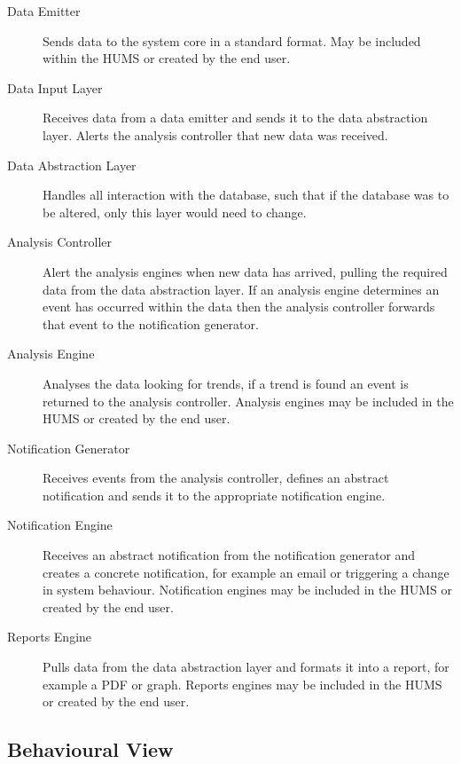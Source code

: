 \documentclass[10pt,a4paper]{article}
\begin{document}
\begin{description}
  \item[Data Emitter] Sends data to the system core in a standard
    format. May be included within the HUMS or created by the end
    user.

  \item[Data Input Layer] Receives data from a data emitter and sends
    it to the data abstraction layer. Alerts the analysis controller
    that new data was received.

  \item[Data Abstraction Layer] Handles all interaction with the
    database, such that if the database was to be altered, only this
    layer would need to change.

  \item[Analysis Controller] Alert the analysis engines when new data
    has arrived, pulling the required data from the data abstraction
    layer. If an analysis engine determines an event has occurred
    within the data then the analysis controller forwards that event
    to the notification generator.

  \item[Analysis Engine] Analyses the data looking for trends, if a
    trend is found an event is returned to the analysis
    controller. Analysis engines may be included in the HUMS or
    created by the end user.

  \item[Notification Generator] Receives events from the analysis
    controller, defines an abstract notification and sends it to the
    appropriate notification engine.

  \item[Notification Engine] Receives an abstract notification from
    the notification generator and creates a concrete notification,
    for example an email or triggering a change in system
    behaviour. Notification engines may be included in the HUMS or
    created by the end user.

  \item[Reports Engine] Pulls data from the data abstraction layer and
    formats it into a report, for example a PDF or graph. Reports
    engines may be included in the HUMS or created by the end user.
\end{description}

\subsection{Behavioural View}
\end{document}
